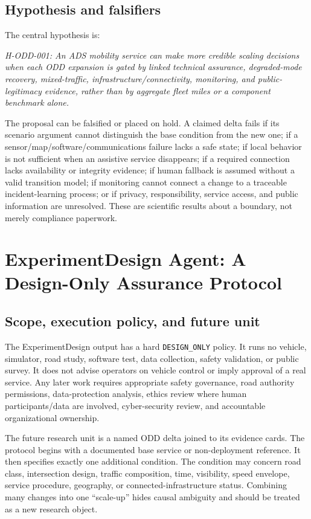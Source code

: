 \documentclass[conference]{../../../../Conference-LaTeX-template_10-17-19/IEEEtran}
\begin{document}
\subsection{Hypothesis and falsifiers}
The central hypothesis is:

\emph{H-ODD-001: An ADS mobility service can make more credible scaling decisions when each ODD expansion is gated by linked technical assurance, degraded-mode recovery, mixed-traffic, infrastructure/connectivity, monitoring, and public-legitimacy evidence, rather than by aggregate fleet miles or a component benchmark alone.}

The proposal can be falsified or placed on hold. A claimed delta fails if its scenario argument cannot distinguish the base condition from the new one; if a sensor/map/software/communications failure lacks a safe state; if local behavior is not sufficient when an assistive service disappears; if a required connection lacks availability or integrity evidence; if human fallback is assumed without a valid transition model; if monitoring cannot connect a change to a traceable incident-learning process; or if privacy, responsibility, service access, and public information are unresolved. These are scientific results about a boundary, not merely compliance paperwork.

\section{ExperimentDesign Agent: A Design-Only Assurance Protocol}
\subsection{Scope, execution policy, and future unit}
The ExperimentDesign output has a hard \texttt{DESIGN\_ONLY} policy. It runs no vehicle, simulator, road study, software test, data collection, safety validation, or public survey. It does not advise operators on vehicle control or imply approval of a real service. Any later work requires appropriate safety governance, road authority permissions, data-protection analysis, ethics review where human participants/data are involved, cyber-security review, and accountable organizational ownership.

The future research unit is a named ODD delta joined to its evidence cards. The protocol begins with a documented base service or non-deployment reference. It then specifies exactly one additional condition. The condition may concern road class, intersection design, traffic composition, time, visibility, speed envelope, service procedure, geography, or connected-infrastructure status. Combining many changes into one ``scale-up'' hides causal ambiguity and should be treated as a new research object.
\end{document}
